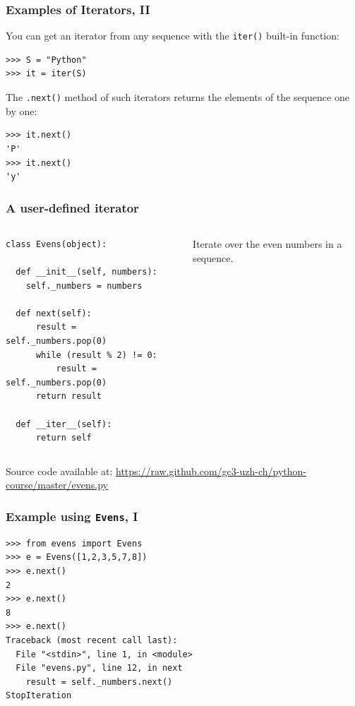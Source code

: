 \documentclass[english,serif,mathserif,xcolor=pdftex,dvipsnames,table]{beamer}
\begin{document}
\begin{frame}[fragile]
  \frametitle{Examples of Iterators, II}

  You can get an iterator from any sequence with the \texttt{iter()} built-in function:
\begin{lstlisting}
>>> S = "Python"
>>> it = iter(S)
\end{lstlisting}

  \+
  The \texttt{.next()} method of such iterators returns the
  elements of the sequence one by one:
\begin{lstlisting}
>>> it.next()
'P'
>>> it.next()
'y'
\end{lstlisting}
\end{frame}


\begin{frame}[fragile]
  \frametitle{A user-defined iterator}
  \begin{columns}[t]
    \begin{column}{0.5\textwidth}
\begin{lstlisting}
class Evens(object):

  def __init__(self, numbers):
    self._numbers = numbers

  def next(self):
      result = self._numbers.pop(0)
      while (result % 2) != 0:
          result = self._numbers.pop(0)
      return result

  def __iter__(self):
      return self
\end{lstlisting}
    \end{column}
    \begin{column}{0.5\textwidth}
      \raggedleft
      Iterate over the even numbers in a sequence.
    \end{column}
  \end{columns}

  \+
  {\scriptsize Source code available at:
    \url{https://raw.github.com/gc3-uzh-ch/python-course/master/evens.py}}
\end{frame}


\begin{frame}[fragile]
  \frametitle{Example using \texttt{Evens}, I}
\begin{lstlisting}
>>> from evens import Evens
>>> e = Evens([1,2,3,5,7,8])
>>> e.next()
2
>>> e.next()
8
>>> e.next()
Traceback (most recent call last):
  File "<stdin>", line 1, in <module>
  File "evens.py", line 12, in next
    result = self._numbers.next()
StopIteration
\end{lstlisting}
\end{frame}
\end{document}
